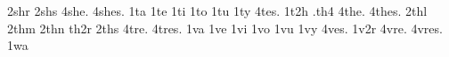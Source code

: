 {2shr                                                                            
2shs                                                                            
4she.                                                                           
4shes.                                                                          
1ta                                                                             
1te                                                                             
1ti                                                                             
1to                                                                             
1tu                                                                             
1ty                                                                             
4tes.                                                                           
1t2h                                                                            
.th4                                                                            
4the.                                                                           
4thes.                                                                          
2thl                                                                            
2thm                                                                            
2thn                                                                            
th2r                                                                            
2ths                                                                            
4tre.                                                                           
4tres.                                                                          
1va                                                                             
1ve                                                                             
1vi                                                                             
1vo                                                                             
1vu                                                                             
1vy                                                                             
4ves.                                                                           
1v2r                                                                            
4vre.                                                                           
4vres.                                                                          
1wa                                                                             
}
